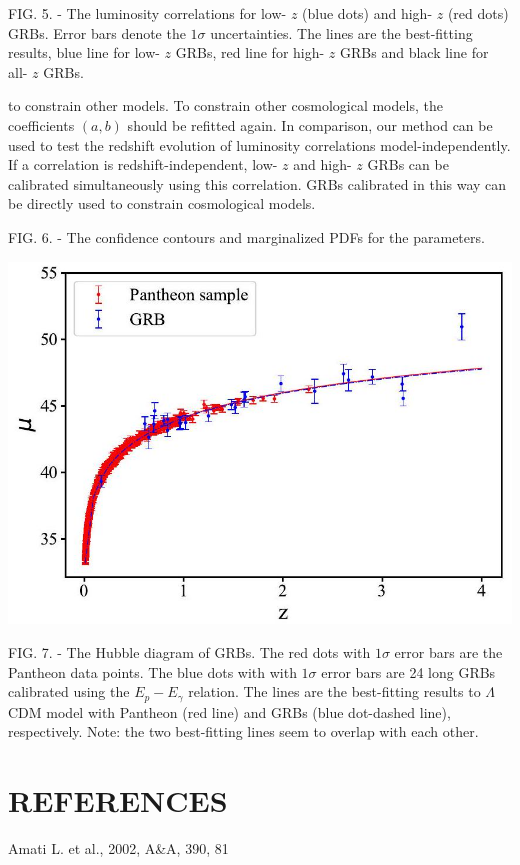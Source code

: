 \documentclass[10pt, a4paper]{article}
\begin{document}
FIG. 5. - The luminosity correlations for low- $z$ (blue dots) and high- $z$ (red dots) GRBs. Error bars denote the $1 \sigma$ uncertainties. The lines are the best-fitting results, blue line for low- $z$ GRBs, red line for high- $z$ GRBs and black line for all- $z$ GRBs.

to constrain other models. To constrain other cosmological models, the coefficients $(a, b)$ should be refitted again. In comparison, our method can be used to test the redshift evolution of luminosity correlations model-independently. If a correlation is redshift-independent, low- $z$ and high- $z$ GRBs can be calibrated simultaneously using this correlation. GRBs calibrated in this way can be directly used to constrain cosmological models.

FIG. 6. - The confidence contours and marginalized PDFs for the parameters.

\includegraphics[max width=\textwidth]{2022_04_27_cf6124939ea404970a21g-11}

FIG. 7. - The Hubble diagram of GRBs. The red dots with $1 \sigma$ error bars are the Pantheon data points. The blue dots with with $1 \sigma$ error bars are 24 long GRBs calibrated using the $E_{p}-E_{\gamma}$ relation. The lines are the best-fitting results to $\Lambda$ CDM model with Pantheon (red line) and GRBs (blue dot-dashed line), respectively. Note: the two best-fitting lines seem to overlap with each other.

\section{REFERENCES}
Amati L. et al., 2002, A\&A, 390, 81
\end{document}
